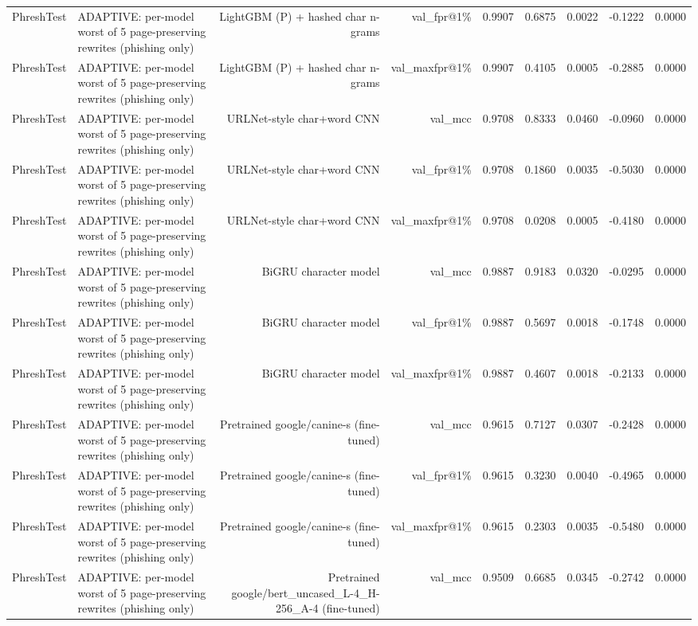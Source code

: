 \begin{table}[t]
\begin{tabular}{llrrrrrrr}
PhreshTest & ADAPTIVE: per-model worst of 5 page-preserving rewrites (phishing only) & LightGBM (P) + hashed char n-grams & val\_fpr@1\% & 0.9907 & 0.6875 & 0.0022 & -0.1222 & 0.0000 \\
PhreshTest & ADAPTIVE: per-model worst of 5 page-preserving rewrites (phishing only) & LightGBM (P) + hashed char n-grams & val\_maxfpr@1\% & 0.9907 & 0.4105 & 0.0005 & -0.2885 & 0.0000 \\
PhreshTest & ADAPTIVE: per-model worst of 5 page-preserving rewrites (phishing only) & URLNet-style char+word CNN & val\_mcc & 0.9708 & 0.8333 & 0.0460 & -0.0960 & 0.0000 \\
PhreshTest & ADAPTIVE: per-model worst of 5 page-preserving rewrites (phishing only) & URLNet-style char+word CNN & val\_fpr@1\% & 0.9708 & 0.1860 & 0.0035 & -0.5030 & 0.0000 \\
PhreshTest & ADAPTIVE: per-model worst of 5 page-preserving rewrites (phishing only) & URLNet-style char+word CNN & val\_maxfpr@1\% & 0.9708 & 0.0208 & 0.0005 & -0.4180 & 0.0000 \\
PhreshTest & ADAPTIVE: per-model worst of 5 page-preserving rewrites (phishing only) & BiGRU character model & val\_mcc & 0.9887 & 0.9183 & 0.0320 & -0.0295 & 0.0000 \\
PhreshTest & ADAPTIVE: per-model worst of 5 page-preserving rewrites (phishing only) & BiGRU character model & val\_fpr@1\% & 0.9887 & 0.5697 & 0.0018 & -0.1748 & 0.0000 \\
PhreshTest & ADAPTIVE: per-model worst of 5 page-preserving rewrites (phishing only) & BiGRU character model & val\_maxfpr@1\% & 0.9887 & 0.4607 & 0.0018 & -0.2133 & 0.0000 \\
PhreshTest & ADAPTIVE: per-model worst of 5 page-preserving rewrites (phishing only) & Pretrained google/canine-s (fine-tuned) & val\_mcc & 0.9615 & 0.7127 & 0.0307 & -0.2428 & 0.0000 \\
PhreshTest & ADAPTIVE: per-model worst of 5 page-preserving rewrites (phishing only) & Pretrained google/canine-s (fine-tuned) & val\_fpr@1\% & 0.9615 & 0.3230 & 0.0040 & -0.4965 & 0.0000 \\
PhreshTest & ADAPTIVE: per-model worst of 5 page-preserving rewrites (phishing only) & Pretrained google/canine-s (fine-tuned) & val\_maxfpr@1\% & 0.9615 & 0.2303 & 0.0035 & -0.5480 & 0.0000 \\
PhreshTest & ADAPTIVE: per-model worst of 5 page-preserving rewrites (phishing only) & Pretrained google/bert\_uncased\_L-4\_H-256\_A-4 (fine-tuned) & val\_mcc & 0.9509 & 0.6685 & 0.0345 & -0.2742 & 0.0000 \\

\end{tabular}
\end{table}

